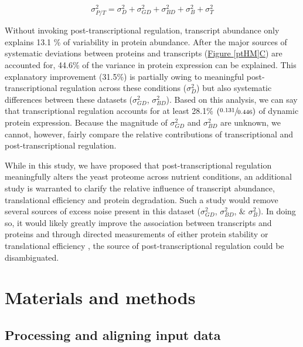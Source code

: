 \begin{equation}
\sigma^{2}_{P/T} = \sigma^{2}_{D} + \sigma^{2}_{GD} + \sigma^{2}_{BD} + \sigma^{2}_{B} + \sigma^{2}_{T}\label{eq:sources_of_ptvar}
\end{equation}

Without invoking post-transcriptional regulation, transcript abundance only explains 13.1 \% of variability in protein abundance. After the major sources of systematic deviations between proteins and transcripts (\hyperref[ptHM]{Figure \ref{ptHM}C}) are accounted for, 44.6\% of the variance in protein expression can be explained. This explanatory improvement (31.5\%) is partially owing to meaningful post-transcriptional regulation across these conditions ($\sigma^{2}_{D}$) but also systematic differences between these datasets ($\sigma^{2}_{GD}$, $\sigma^{2}_{BD}$). Based on this analysis, we can say that transcriptional regulation accounts for at least 28.1\% $\left(\sfrac{0.131}{0.446}\right)$ of dynamic protein expression. Because the magnitude of $\sigma^{2}_{GD}$ and $\sigma^{2}_{BD}$ are unknown, we cannot, however, fairly compare the relative contributions of transcriptional and post-transcriptional regulation.

While in this study, we have proposed that post-transcriptional regulation meaningfully alters the yeast proteome across nutrient conditions, an additional study is warranted to clarify the relative influence of transcript abundance, translational efficiency and protein degradation. Such a study would remove several sources of excess noise present in this dataset ($\sigma^{2}_{GD}$, $\sigma^{2}_{BD}$, $\&$ $\sigma^{2}_{B}$). In doing so, it would likely greatly improve the association between transcripts and proteins and through directed measurements of either protein stability or translational efficiency \cite{Belle:2006hv, Ingolia:2009dp}, the source of post-transcriptional regulation could be disambiguated.

\section{Materials and methods}

\subsection{Processing and aligning input data}

